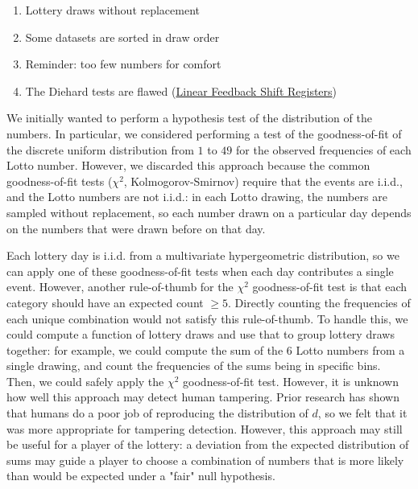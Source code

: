 \begin{enumerate}
    \item Lottery draws without replacement
    \item Some datasets are sorted in draw order
    \item Reminder: too few numbers for comfort
    \item The Diehard tests are flawed (\href{https://crypto.stackexchange.com/a/397}{Linear Feedback Shift Registers})
\end{enumerate}

We initially wanted to perform a hypothesis test of the distribution of the numbers. 
In particular, we considered performing a test of the goodness-of-fit of 
the discrete uniform distribution from $1$ to $49$ for the observed frequencies
of each Lotto number. However, we discarded this approach because the common goodness-of-fit tests
($\chi^2$, Kolmogorov-Smirnov) require that the events are i.i.d., and the Lotto numbers
are not i.i.d.: in each Lotto drawing, the numbers are sampled without replacement,
so each number drawn on a particular day depends on the numbers that were drawn before
on that day.

Each lottery day is i.i.d. from a multivariate hypergeometric distribution,
so we can apply one of these goodness-of-fit tests when each day contributes a single
event. However, another rule-of-thumb for the $\chi^2$ goodness-of-fit test is that
each category should have an expected count $\geq 5$. Directly counting the frequencies
of each unique combination would not satisfy this rule-of-thumb. To handle this, we could compute
a function of lottery draws and use that to group lottery draws together: for example,
we could compute the sum of the 6 Lotto numbers from a single drawing, and count
the frequencies of the sums being in specific bins. Then, we could safely apply the 
$\chi^2$ goodness-of-fit test. However, it is unknown how well this approach may
detect human tampering. Prior research has shown that humans do a poor job of 
reproducing the distribution of $d$, so we felt that it was more appropriate for 
tampering detection. However, this approach may still be useful for a player of the lottery:
a deviation from the expected distribution of sums may guide a player to choose
a combination of numbers that is more likely than would be expected under a "fair"
null hypothesis.